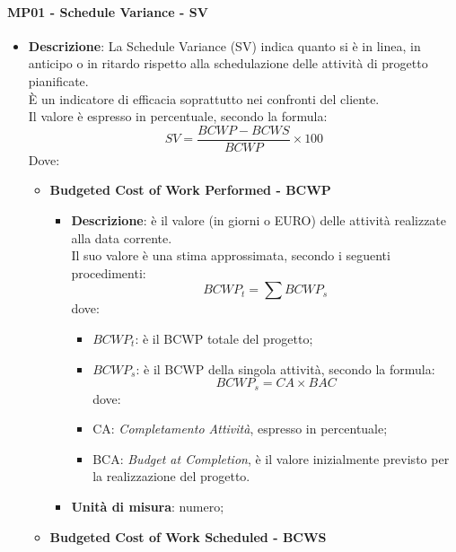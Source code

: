	 	\paragraph{MP01 - Schedule Variance - SV}
	 	\begin{itemize}
	 		\item \textbf{Descrizione}:
	 			La Schedule Variance (SV) indica quanto si è in linea, in anticipo o in ritardo rispetto alla schedulazione delle attività di progetto pianificate. \\
	 			È un indicatore di efficacia soprattutto nei confronti del cliente.\\
	 			Il valore è espresso in percentuale, secondo la formula:
	 			\begin{displaymath}
	 				SV = \frac{BCWP-BCWS}{BCWP}\times100
	 			\end{displaymath}
	 			Dove:
	 			\begin{itemize}
	 				\item {\bfseries Budgeted Cost of Work Performed - BCWP}
	 				\begin{itemize}
	 					\item \textbf{Descrizione}:
	 					è  il valore (in giorni o EURO) delle attività realizzate alla data corrente.\\
	 					Il suo valore è una stima approssimata, secondo i seguenti procedimenti:
	 					\begin{displaymath}
	 						BCWP_t = \sum BCWP_s
	 					\end{displaymath}
	 					dove:
	 					\begin{itemize}
	 						\item {\bfseries $BCWP_t$}: è il BCWP totale del progetto;
	 						\item {\bfseries $BCWP_s$}: è il BCWP della singola attività, secondo la formula:
	 						\begin{displaymath}
	 							BCWP_s = CA\times BAC
	 						\end{displaymath}
	 						dove:
	 						\item  CA: {\itshape Completamento Attività}, espresso in percentuale;
	 						\item BCA: {\itshape Budget at Completion}, è il valore inizialmente previsto per la realizzazione del progetto.
	 					\end{itemize}
	 					\item \textbf{Unità di misura}: numero;
	 				\end{itemize}
	 				\item {\bfseries Budgeted Cost of Work Scheduled - BCWS}

\end{itemize}
\end{itemize}
